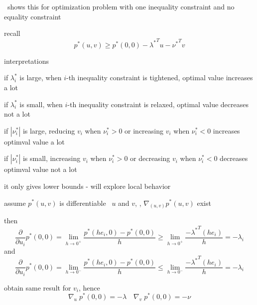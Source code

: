 \documentclass[17pt,landscape]{foils}
\begin{document}
{\item
	\
	shows this for optimization problem
	with one inequality constraint and no equality constraint
\eit

\begin{figure}
\begin{center}
	\dualitygraphfive{1em}
	\label{fig:sensitivity analysis of optimal value}
\end{center}
\end{figure}
\vfill



\bit
\item
	recall
	$$
		p^\ast(u,v)\geq p^\ast(0,0) - {\lambda^\ast}^T u - {\nu^\ast}^T v
	$$

\vitem
	interpretations
	\bit
	\item
		if $\lambda^\ast_i$ is large, when $i$-th inequality constraint is tightened,
		optimal value increases a lot

	\item
		if $\lambda^\ast_i$ is small, when $i$-th inequality constraint is relaxed,
		optimal value decreases not a lot

	\item
		if $|\nu^\ast_i|$ is large,
		reducing $v_i$ when $\nu^\ast_i>0$ or increasing $v_i$ when $\nu^\ast_i<0$
		increases optimval value a lot

	\item
		if $|\nu^\ast_i|$ is small,
		increasing $v_i$ when $\nu^\ast_i>0$ or decreasing $v_i$ when $\nu^\ast_i<0$
		decreases optimval value not a lot
	\eit

\vitem
	it only gives lower bounds - will explore local behavior
\eit
\vfill



\bit
\item
	assume $p^\ast(u,v)$ is differentiable \wrt\ $u$ and $v$,
	\ie, $\nabla_{(u,v)} p^\ast(u,v)$ exist
	\bit
	\item
		then
		$$
			\frac{\partial}{\partial u_i} p^\ast (0,0)
			=
			\lim_{h\to 0^+} \frac{p^\ast(he_i,0) - p^\ast(0,0)}{h}
			\geq
			\lim_{h\to 0^+} \frac{-{\lambda^\ast}^T (he_i) }{h}
			=
			-\lambda_i
		$$
		and
		$$
			\frac{\partial}{\partial u_i} p^\ast (0,0)
			=
			\lim_{h\to 0^-} \frac{p^\ast(he_i,0) - p^\ast(0,0)}{h}
			\leq
			\lim_{h\to 0^-} \frac{-{\lambda^\ast}^T (he_i) }{h}
			=
			-\lambda_i
		$$
	\item
		obtain same result for $v_i$, hence
		$$
			\nabla_u\; p^\ast (0,0) = -\lambda
			\quad
			\nabla_v\; p^\ast (0,0) = -\nu
		$$
	\eit

}
\end{document}
